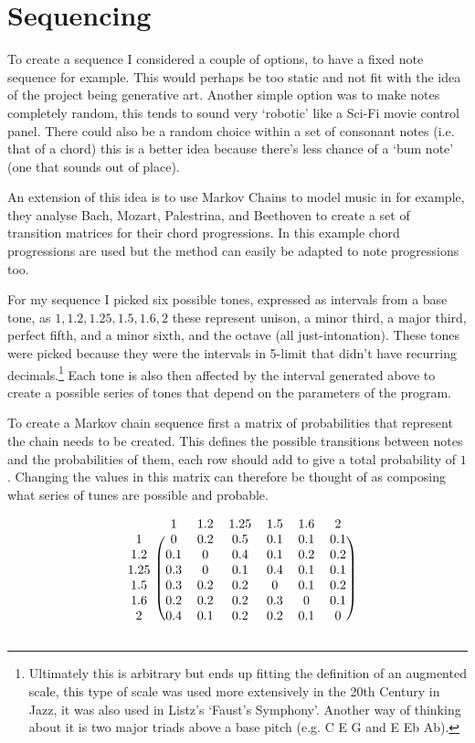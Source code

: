 \section{Sequencing}
To create a sequence I considered a couple of options, to have a fixed note
sequence for example. This would perhaps be too static and not fit with the idea
of the project being generative art. Another simple option was to make notes
completely random, this tends to sound very `robotic' like a Sci-Fi movie
control panel. There could also be a random choice within a set of consonant
notes (i.e. that of a chord) this is a better idea because there's less chance
of a `bum note' (one that sounds out of place).

An extension of this idea is to use Markov Chains to model music in
\citep{ballstate2016} for example, they analyse Bach, Mozart, Palestrina, and
Beethoven to create a set of transition matrices for their chord progressions.
In this example chord progressions are used but the method can easily be adapted
to note progressions too. 

For my sequence I picked six possible tones, expressed as intervals from a base
tone, as $1, 1.2, 1.25, 1.5, 1.6, 2$ these represent unison, a minor third, a
major third, perfect fifth, and a minor sixth, and the octave (all
just-intonation). These tones were picked because they were the intervals in
5-limit that didn't have recurring decimals.\footnote{Ultimately this is arbitrary but
ends up fitting the definition of an augmented scale, this type of scale was
used more extensively in the 20th Century in Jazz, it was also used in Listz's
`Faust's Symphony'. Another way of thinking about it is two major triads above a
base pitch (e.g. C E G and E Eb Ab).} Each tone is also then affected by the
interval generated above to create a possible series of tones that depend on the
parameters of the program.

To create a Markov chain sequence first a matrix of probabilities that represent
the chain needs to be created. This defines the possible transitions between
notes and the probabilities of them, each row should add to give a total
probability of $1$. Changing the values in this matrix can therefore be thought
of as composing what series of tunes are possible and probable.

\[
\begin{blockarray}{ccccccc}
    & 1 & 1.2 & 1.25 & 1.5 & 1.6 & 2\\
    \begin{block}{c (cccccc)}
        1    & 0  & 0.2& 0.5& 0.1& 0.1& 0.1\\
        1.2  & 0.1& 0  & 0.4& 0.1& 0.2& 0.2\\
        1.25 & 0.3& 0  & 0.1& 0.4& 0.1& 0.1\\
        1.5  & 0.3& 0.2& 0.2& 0  & 0.1& 0.2\\
        1.6  & 0.2& 0.2& 0.2& 0.3& 0  & 0.1\\
        2    & 0.4& 0.1& 0.2& 0.2& 0.1& 0  \\
    \end{block}
\end{blockarray}
\]

